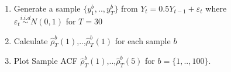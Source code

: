 \documentclass{beamer}
\begin{document}
	
	
	
	


\begin{frame}
\vspace{-1.8cm}
\begin{center} 

\end{center}
\begin{figure}
\begin{minipage}[c]{0.5\textwidth}
\end{minipage}  \quad \begin{minipage}[c]{0.45\textwidth}
\small
\vspace{1cm}

\begin{enumerate}	
\item Generate a sample $\{y_1^b,..,y_T^b\}$ from $Y_t=0.5Y_{t-1} +\varepsilon_t$ where $\varepsilon_t \overset{i.i.d}{\sim} N(0,1)$ for $T=30$
\vspace{1.5cm}
\item Calculate $\hat{\rho}_{T}^b(1)$,..,$\hat{\rho}_{T}^b(1)$	for each sample $b$   

\vspace{1.5cm}


\item	Plot  Sample ACF  $\hat{\rho}_{T}^b(1)$,..,$\hat{\rho}_{T}^b(5)$   for  $b=\{1,..,100\}$.

\end{enumerate}

\end{minipage}
\end{figure}

\end{frame}





\begin{frame}

\begin{figure}

\hspace{-6cm}				

\end{figure}

\end{frame}


\begin{frame}

\begin{figure}

\hspace{-6cm}	

\end{figure}

\end{frame}
\end{document}
